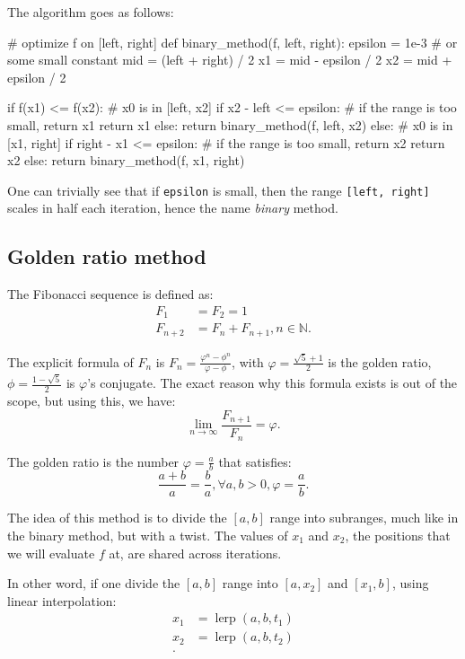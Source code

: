 The algorithm goes as follows:
\begin{python}
# optimize f on [left, right]
def binary_method(f, left, right):
  epsilon = 1e-3 # or some small constant
  mid = (left + right) / 2
  x1 = mid - epsilon / 2
  x2 = mid + epsilon / 2

  if f(x1) <= f(x2):
    # x0 is in [left, x2]
    if x2 - left <= epsilon:
      # if the range is too small, return x1
      return x1
    else:
      return binary_method(f, left, x2)
  else:
    # x0 is in [x1, right]
    if right - x1 <= epsilon:
      # if the range is too small, return x2
      return x2
    else:
      return binary_method(f, x1, right)
\end{python}

One can trivially see that if \verb|epsilon| is small, then the range
\verb|[left, right]| scales in half each iteration, hence the name
\textit{binary} method.


\subsection{Golden ratio method} %
\label{sub:Golden ratio method}

The Fibonacci sequence is defined as:
\begin{align*}
  F_{1} &= F_{2} = 1 \\
  F_{n+2} &= F_{n} + F_{n + 1}, n \in \mathbb{N}
.\end{align*}

The explicit formula of \( F_{n} \) is \( F_{n} = \frac{\varphi^{n} -
\phi^{n}}{\varphi - \phi} \), with \( \varphi = \frac{\sqrt{5}  + 1}{2} \) is
the golden ratio, \( \phi =  \frac{1 - \sqrt{5} }{2} \) is \( \varphi \)'s
conjugate. The exact reason why this formula exists is out of the scope, but
using this, we have:
\[
  \lim_{n \to \infty} \frac{F_{n + 1}}{F_{n}} = \varphi
.\] 

The golden ratio is the number \( \varphi = \frac{a}{b} \) that satisfies:
\[
  \frac{a + b}{a} = \frac{b}{a}, \forall a, b > 0, \varphi = \frac{a}{b}.
\]

The idea of this method is to divide the \( [a, b] \) range into subranges, much
like in the binary method, but with a twist. The values of \( x_{1} \) and \(
x_{2} \), the positions that we will evaluate \( f \) at, are shared across
iterations.

In other word, if one divide the \( [a, b] \) range into \( [a, x_{2}] \) and \(
[x_{1}, b]\), using linear interpolation:
\begin{align*}
  x_{1} &= \operatorname{lerp}(a, b, t_{1}) \\
  x_{2} &=  \operatorname{lerp}(a, b, t_{2}) \\
.\end{align*}

